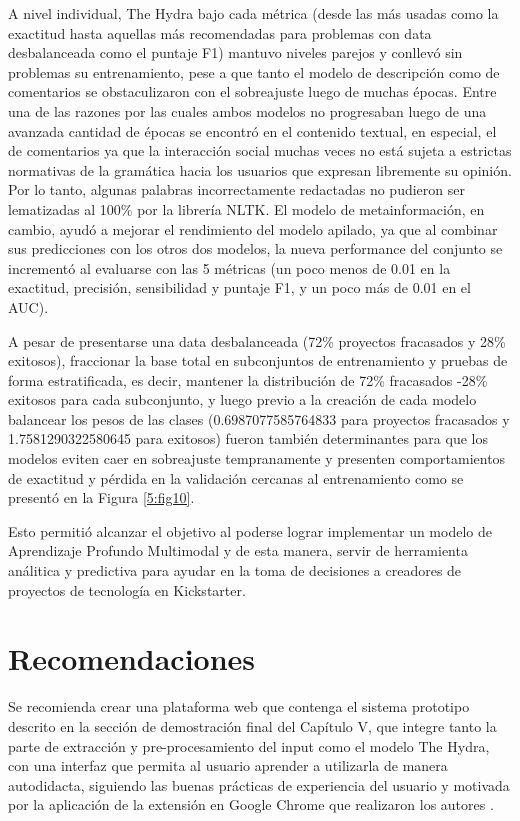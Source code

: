 A nivel individual, The Hydra bajo cada métrica (desde las más usadas como la exactitud hasta aquellas más recomendadas para problemas con data desbalanceada como el puntaje F1) mantuvo niveles parejos y conllevó sin problemas su entrenamiento, pese a que tanto el modelo de descripción como de comentarios se obstaculizaron con el sobreajuste luego de muchas épocas. Entre una de las razones por las cuales ambos modelos no progresaban luego de una avanzada cantidad de épocas se encontró en el contenido textual, en especial, el de comentarios ya que la interacción social muchas veces no está sujeta a estrictas normativas de la gramática hacia los usuarios que expresan libremente su opinión. Por lo tanto, algunas palabras incorrectamente redactadas no pudieron ser lematizadas al 100\% por la librería NLTK. El modelo de metainformación, en cambio, ayudó a mejorar el rendimiento del modelo apilado, ya que al combinar sus predicciones con los otros dos modelos, la nueva performance del conjunto se incrementó al evaluarse con las 5 métricas (un poco menos de 0.01 en la exactitud, precisión, sensibilidad y puntaje F1, y un poco más de 0.01 en el AUC).

A pesar de presentarse una data desbalanceada (72\% proyectos fracasados y 28\% exitosos), fraccionar la base total en subconjuntos de entrenamiento y pruebas de forma estratificada, es decir, mantener la distribución de 72\% fracasados -28\% exitosos para cada subconjunto, y luego previo a la creación de cada modelo balancear los pesos de las clases (0.6987077585764833 para proyectos fracasados y 1.7581290322580645 para exitosos) fueron también determinantes para que los modelos eviten caer en sobreajuste tempranamente y presenten comportamientos de exactitud y pérdida en la validación cercanas al entrenamiento como se presentó en la Figura \ref{5:fig10}.

Esto permitió alcanzar el objetivo al poderse lograr implementar un modelo de Aprendizaje Profundo Multimodal y de esta manera, servir de herramienta análitica y predictiva para ayudar en la toma de decisiones a creadores de proyectos de tecnología en Kickstarter.

\section{Recomendaciones}
Se recomienda crear una plataforma web que contenga el sistema prototipo descrito en la sección de demostración final del Capítulo V, que integre tanto la parte de extracción y pre-procesamiento del input como el modelo The Hydra, con una interfaz que permita al usuario aprender a utilizarla de manera autodidacta, siguiendo las buenas prácticas de experiencia del usuario y motivada por la aplicación de la extensión en Google Chrome que realizaron los autores \cite{pr_chen2013kickpredict}.

